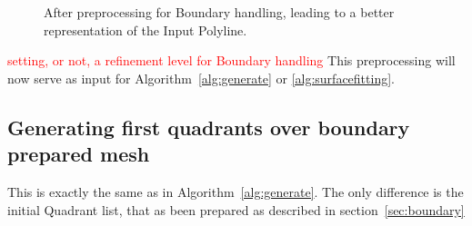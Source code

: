 \documentclass[10pt]{article}
\begin{document}
 \begin{figure}[htb]
\centering
\caption{After preprocessing for Boundary handling, leading to a better representation of the Input Polyline.}
\label{fig:boundary}
\end{figure}

\textcolor{red}{setting, or not, a refinement level for Boundary handling}
This preprocessing will now serve as input for Algorithm~\ref{alg:generate} or \ref{alg:surfacefitting}. 


\subsection{Generating first quadrants over boundary prepared mesh}
This is exactly the same as in Algorithm~\ref{alg:generate}. The only difference is the initial Quadrant list, that as been prepared as described in section~\ref{sec:boundary}
\end{document}
